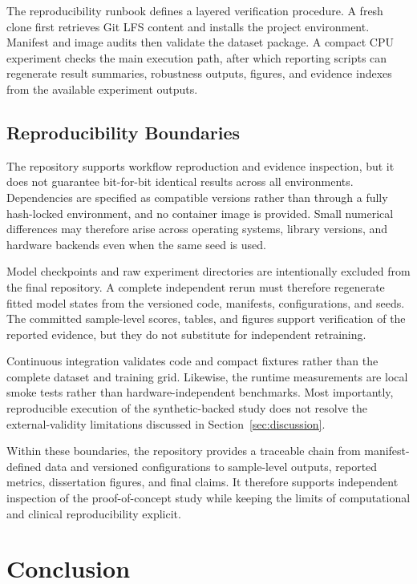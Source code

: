 \documentclass[fleqn,12pt]{olplainarticle}
\begin{document}
The reproducibility runbook defines a layered verification procedure. A fresh
clone first retrieves Git LFS content and installs the project environment.
Manifest and image audits then validate the dataset package. A compact CPU
experiment checks the main execution path, after which reporting scripts can
regenerate result summaries, robustness outputs, figures, and evidence
indexes from the available experiment outputs.

\subsection{Reproducibility Boundaries}
\label{subsec:reproducibility_boundaries}

The repository supports workflow reproduction and evidence inspection, but it
does not guarantee bit-for-bit identical results across all environments.
Dependencies are specified as compatible versions rather than through a fully
hash-locked environment, and no container image is provided. Small numerical
differences may therefore arise across operating systems, library versions,
and hardware backends even when the same seed is used.

Model checkpoints and raw experiment directories are intentionally excluded
from the final repository. A complete independent rerun must therefore
regenerate fitted model states from the versioned code, manifests,
configurations, and seeds. The committed sample-level scores, tables, and
figures support verification of the reported evidence, but they do not
substitute for independent retraining.

Continuous integration validates code and compact fixtures rather than the
complete dataset and training grid. Likewise, the runtime measurements are
local smoke tests rather than hardware-independent benchmarks. Most
importantly, reproducible execution of the synthetic-backed study does not
resolve the external-validity limitations discussed in
Section~\ref{sec:discussion}.

Within these boundaries, the repository provides a traceable chain from
manifest-defined data and versioned configurations to sample-level outputs,
reported metrics, dissertation figures, and final claims. It therefore
supports independent inspection of the proof-of-concept study while keeping
the limits of computational and clinical reproducibility explicit.

\newpage
\section{Conclusion}
\label{sec:conclusion}
\end{document}
